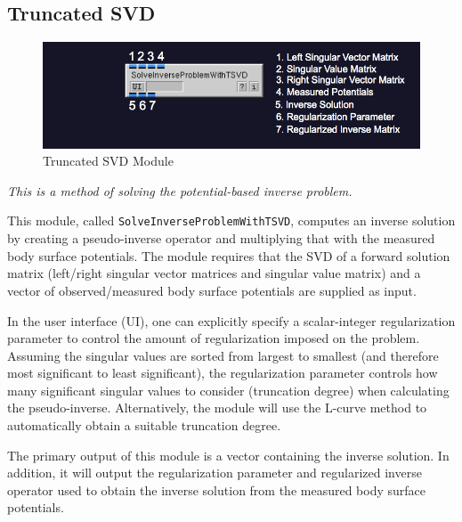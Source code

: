 \subsection{Truncated SVD}

\begin{figure}[H]
\begin{center}
\includegraphics[width=\textwidth]{ECGToolkitGuide_figures/SolveInverseProblemWithTSVD.png}
\caption{Truncated SVD Module}
\label{tsvd}
\end{center}
\end{figure}

\vspace{5pt}\textit{This is a method of solving the potential-based inverse problem.}\vspace{5pt}

This module, called {\tt SolveInverseProblemWithTSVD}, computes an inverse solution by creating a pseudo-inverse operator and multiplying that with the measured body surface potentials. The module requires that the SVD of a forward solution matrix (left/right singular vector matrices and singular value matrix) and a vector of observed/measured body surface potentials are supplied as input.

In the user interface (UI), one can explicitly specify a scalar-integer regularization parameter to control the amount of regularization imposed on the problem. Assuming the singular values are sorted from largest to smallest (and therefore most significant to least significant), the regularization parameter controls how many significant singular values to consider (truncation degree) when calculating the pseudo-inverse. Alternatively, the module will use the L-curve method to automatically obtain a suitable truncation degree.

The primary output of this module is a vector containing the inverse solution. In addition, it will output the regularization parameter and regularized inverse operator used to obtain the inverse solution from the measured body surface potentials.


